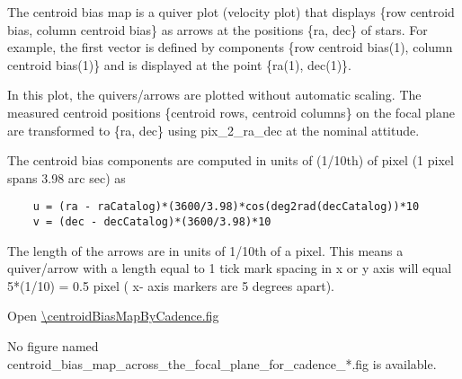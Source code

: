 The centroid bias map is a quiver plot (velocity plot) that displays
\{row centroid bias, column centroid bias\} as arrows at the positions
\{ra, dec\} of stars. For example, the first vector is defined by
components \{row centroid bias(1), column centroid bias(1)\} and is
displayed at the point \{ra(1), dec(1)\}.

In this plot, the quivers/arrows are plotted without automatic
scaling. The measured centroid positions \{centroid rows, centroid
columns\} on the focal plane are transformed to \{ra, dec\} using
pix\_2\_ra\_dec at the nominal attitude.

The centroid bias components are computed in units of (1/10th) of
pixel (1 pixel spans 3.98 arc sec) as

\begin{verbatim}
    u = (ra - raCatalog)*(3600/3.98)*cos(deg2rad(decCatalog))*10 
    v = (dec - decCatalog)*(3600/3.98)*10
\end{verbatim}

The length of the arrows are in units of 1/10th of a pixel. This means
a quiver/arrow with a length equal to 1 tick mark spacing in x or y
axis will equal 5*(1/10) = 0.5 pixel ( x- axis markers are 5 degrees
apart).

Open \url{\centroidBiasMapByCadence.fig}

\else
No figure named
centroid\_bias\_map\_across\_the\_focal\_plane\_for\_cadence\_*.fig is
available.
\fi

\clearpage
